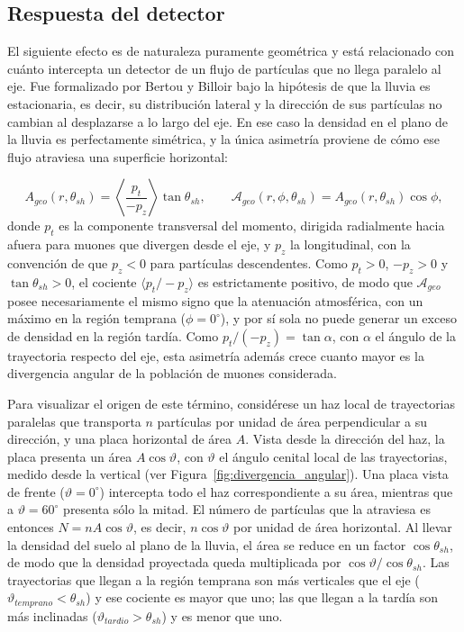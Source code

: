 \subsection{Respuesta del detector}
\label{subsubsec:divergencia}
\label{subsubsec:respuesta_detector}

El siguiente efecto es de naturaleza puramente geométrica y está relacionado con cuánto intercepta un detector de un flujo de partículas que no llega paralelo al eje. Fue formalizado por Bertou y Billoir \cite{GAP2000_017} bajo la hipótesis de que la lluvia es estacionaria, es decir, su distribución lateral y la dirección de sus partículas no cambian al desplazarse a lo largo del eje. En ese caso la densidad en el plano de la lluvia es perfectamente simétrica, y la única asimetría proviene de cómo ese flujo atraviesa una superficie horizontal:

\begin{equation}
	A_{geo}(r,\theta_{sh}) = \left\langle \frac{p_t}{-p_z} \right\rangle \tan\theta_{sh},
	\qquad
	\mathcal{A}_{geo}(r,\phi,\theta_{sh}) = A_{geo}(r,\theta_{sh})\cos\phi,
	\label{eq:efecto_geo}
\end{equation}
%
donde $p_t$ es la componente transversal del momento, dirigida radialmente hacia afuera para muones que divergen desde el eje, y $p_z$ la longitudinal, con la convención de que $p_z < 0$ para partículas descendentes. Como $p_t > 0$, $-p_z > 0$ y $\tan\theta_{sh} > 0$, el cociente $\langle p_t/-p_z \rangle$ es estrictamente positivo, de modo que $\mathcal{A}_{geo}$ posee necesariamente el mismo signo que la atenuación atmosférica, con un máximo en la región temprana ($\phi = 0^\circ$), y por sí sola no puede generar un exceso de densidad en la región tardía. Como $p_t/(-p_z) = \tan\alpha$, con $\alpha$ el ángulo de la trayectoria respecto del eje, esta asimetría además crece cuanto mayor es la divergencia angular de la población de muones considerada.

Para visualizar el origen de este término, considérese un haz local de trayectorias paralelas que transporta $n$ partículas por unidad de área perpendicular a su dirección, y una placa horizontal de área $A$. Vista desde la dirección del haz, la placa presenta un área $A\cos\vartheta$, con $\vartheta$ el ángulo cenital local de las trayectorias, medido desde la vertical (ver Figura~\ref{fig:divergencia_angular}). Una placa vista de frente ($\vartheta=0^\circ$) intercepta todo el haz correspondiente a su área, mientras que a $\vartheta=60^\circ$ presenta sólo la mitad. El número de partículas que la atraviesa es entonces $N=nA\cos\vartheta$, es decir, $n\cos\vartheta$ por unidad de área horizontal. Al llevar la densidad del suelo al plano de la lluvia, el área se reduce en un factor $\cos\theta_{sh}$, de modo que la densidad proyectada queda multiplicada por $\cos\vartheta/\cos\theta_{sh}$. Las trayectorias que llegan a la región temprana son más verticales que el eje ($\vartheta_{temprano} < \theta_{sh}$) y ese cociente es mayor que uno; las que llegan a la tardía son más inclinadas ($\vartheta_{tardio} > \theta_{sh}$) y es menor que uno.

